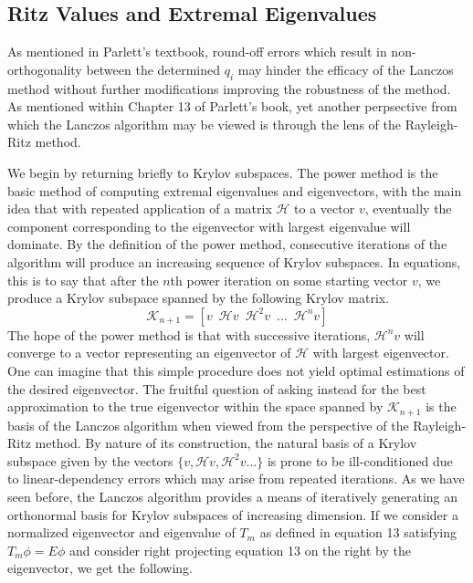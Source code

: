 \documentclass[12pt]{article} %
\begin{document}
\subsection{Ritz Values and Extremal Eigenvalues}
As mentioned in Parlett's textbook, round-off errors which result in non-orthogonality between the determined $q_i$ may hinder the efficacy of the Lanczos method without further modifications improving the robustness of the method. \cite{Parlett} As mentioned within Chapter 13 of Parlett's book, yet another perpsective from which the Lanczos algorithm may be viewed is through the lens of the Rayleigh-Ritz method.

We begin by returning briefly to Krylov subspaces. The power method is the basic method of computing extremal eigenvalues and eigenvectors, with the main idea that with repeated application of a matrix $\mathcal{H}$ to a vector $v$, eventually the component corresponding to the eigenvector with largest eigenvalue will dominate. By the definition of the power method, consecutive iterations of the algorithm will produce an increasing sequence of Krylov subspaces. In equations, this is to say that after the $n$th power iteration on some starting vector $v$, we produce a Krylov subspace spanned by the following Krylov matrix.
\begin{equation}
    \mathcal{K}_{n+1} = [v \enspace \mathcal{H}v \enspace \mathcal{H}^2 v \enspace ... \enspace \mathcal{H}^{n}v]
\end{equation}
The hope of the power method is that with successive iterations, $\mathcal{H}^n v$ will converge to a vector representing an eigenvector of $\mathcal{H}$ with largest eigenvector. One can imagine that this simple procedure does not yield optimal estimations of the desired eigenvector. The fruitful question of asking instead for the best approximation to the true eigenvector within the space spanned by $\mathcal{K}_{n+1}$ is the basis of the Lanczos algorithm when viewed from the perspective of the Rayleigh-Ritz method. By nature of its construction, the natural basis of a Krylov subspace given by the vectors $\{v, \mathcal{H}v, \mathcal{H}^2v ...\}$ is prone to be ill-conditioned due to linear-dependency errors which may arise from repeated iterations. As we have seen before, the Lanczos algorithm provides a means of iteratively generating an orthonormal basis for Krylov subspaces of increasing dimension. If we consider a normalized eigenvector and eigenvalue of $T_m$ as defined in equation 13 satisfying $T_m \phi = E \phi$ and consider right projecting equation 13 on the right by the eigenvector, we get the following.
\end{document}
